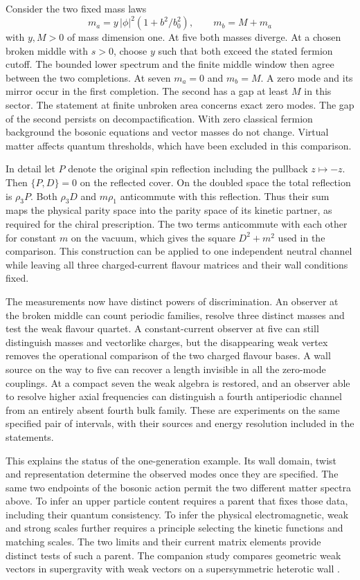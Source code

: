 \documentclass[aps,prd,reprint,onecolumn,nofootinbib,amsmath,amssymb]{revtex4-2}
\begin{document}
Consider the two fixed mass laws
\begin{equation}
 m_a=y\,|\phi|^2(1+b^2/b_0^2),\qquad m_b=M+m_a
\end{equation}
with $y,M>0$ of mass dimension one. At five both masses diverge. At a chosen broken middle with $s>0$, choose $y$ such that both exceed the stated fermion cutoff. The bounded lower spectrum and the finite middle window then agree between the two completions. At seven $m_a=0$ and $m_b=M$. A zero mode and its mirror occur in the first completion. The second has a gap at least $M$ in this sector. The statement at finite unbroken area concerns exact zero modes. The gap of the second persists on decompactification. With zero classical fermion background the bosonic equations and vector masses do not change. Virtual matter affects quantum thresholds, which have been excluded in this comparison.

In detail let $P$ denote the original spin reflection including the pullback $z\mapsto-z$. Then $\{P,D\}=0$ on the reflected cover. On the doubled space the total reflection is $\rho_3P$. Both $\rho_3D$ and $m\rho_1$ anticommute with this reflection. Thus their sum maps the physical parity space into the parity space of its kinetic partner, as required for the chiral prescription. The two terms anticommute with each other for constant $m$ on the vacuum, which gives the square $D^2+m^2$ used in the comparison. This construction can be applied to one independent neutral channel while leaving all three charged-current flavour matrices and their wall conditions fixed.

The measurements now have distinct powers of discrimination. An observer at the broken middle can count periodic families, resolve three distinct masses and test the weak flavour quartet. A constant-current observer at five can still distinguish masses and vectorlike charges, but the disappearing weak vertex removes the operational comparison of the two charged flavour bases. A wall source on the way to five can recover a length invisible in all the zero-mode couplings. At a compact seven the weak algebra is restored, and an observer able to resolve higher axial frequencies can distinguish a fourth antiperiodic channel from an entirely absent fourth bulk family. These are experiments on the same specified pair of intervals, with their sources and energy resolution included in the statements.

This explains the status of the one-generation example. Its wall domain, twist and representation determine the observed modes once they are specified. The same two endpoints of the bosonic action permit the two different matter spectra above. To infer an upper particle content requires a parent that fixes those data, including their quantum consistency. To infer the physical electromagnetic, weak and strong scales further requires a principle selecting the kinetic functions and matching scales. The two limits and their current matrix elements provide distinct tests of such a parent.
The companion study compares geometric weak vectors in supergravity with weak vectors on a supersymmetric heterotic wall \cite{SevenMTheory2026}.
\end{document}

